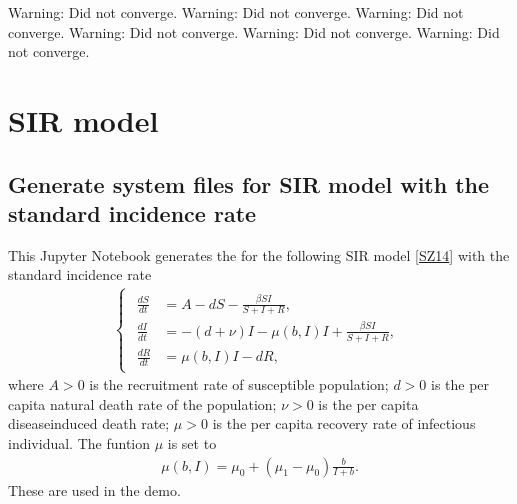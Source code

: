 \documentclass[letterpaper,10pt,english]{jupyterBook}
\begin{document}
\begin{sphinxVerbatim}[commandchars=\\\{\}]
Warning: Did not converge.
Warning: Did not converge.
Warning: Did not converge.
Warning: Did not converge.
Warning: Did not converge.
Warning: Did not converge.
\end{sphinxVerbatim}

\noindent{}


\part{SIR model}


\chapter{Generate system files for SIR model with the standard incidence rate}
\label{\detokenize{SIRmodelGenSym:generate-system-files-for-sir-model-with-the-standard-incidence-rate}}\label{\detokenize{SIRmodelGenSym::doc}}
\sphinxAtStartPar
This Jupyter Notebook generates the  for the following SIR model
{[}\hyperlink{cite.references:id20}{SZ14}{]} with the standard incidence rate
\begin{equation*}
\begin{split}
\begin{cases}
\begin{aligned}
    \frac{d S}{d t} &=A-d S-\frac{\beta S I}{S+I+R}, \\ 
    \frac{d I}{d t} &=-(d+\nu) I-\mu(b,I) I+\frac{\beta S I}{S+I+R}, \\ 
    \frac{d R}{d t} &=\mu(b,I) I-d R,
\end{aligned}
\end{cases}
\end{split}
\end{equation*}
\sphinxAtStartPar
where \(A>0\) is the recruitment rate of susceptible population;
\(d>0\) is the per capita natural death rate of the population; \(\nu>0\) is
the per capita disease\sphinxhyphen{}induced death rate; \(\mu>0\) is the per capita
recovery rate of infectious individual. The funtion \(\mu\) is set to
\begin{equation*}
\begin{split}
\mu(b,I) = \mu_0 + (\mu_1 - \mu_0) \frac{b}{I+b}.
\end{split}
\end{equation*}
\sphinxAtStartPar
These are used in the {\hyperref[\detokenize{SIRmodel::doc}]{}} demo.
\end{document}
